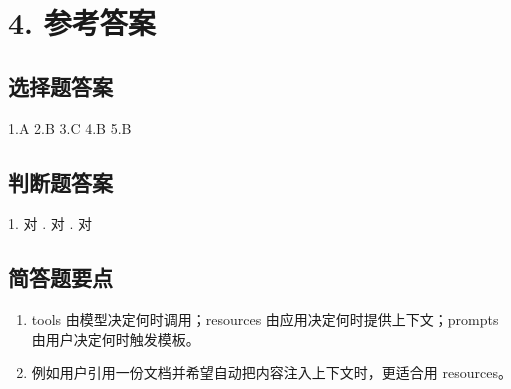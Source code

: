 \documentclass[UTF8,a4paper,11pt]{ctexart}
\begin{document}
\section*{4. 参考答案}
\subsection*{选择题答案}
1.A \quad 2.B \quad 3.C \quad 4.B \quad 5.B

\subsection*{判断题答案}
1. 对 . 对 . 对

\subsection*{简答题要点}
\begin{enumerate}
  \item tools 由模型决定何时调用；resources 由应用决定何时提供上下文；prompts 由用户决定何时触发模板。
  \item 例如用户引用一份文档并希望自动把内容注入上下文时，更适合用 resources。
\end{enumerate}
\end{document}

